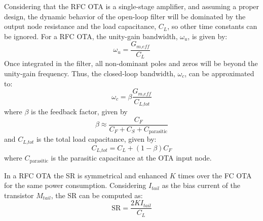 Considering that the RFC OTA is a single-stage amplifier, and assuming a proper design, the dynamic behavior of the open-loop filter will be dominated by the output node resistance and the load capacitance, $C_L$, so other time constants can be ignored. For a RFC OTA, the unity-gain bandwidth, $\omega_u$, is given by:
\begin{equation}
\omega_u = \frac{G_\textit{m,eff}}{C_L}
\end{equation}
Once integrated in the filter, all non-dominant poles and zeros will be beyond the unity-gain frequency. Thus, the closed-loop bandwidth, $\omega_c$, can be approximated to:
\begin{equation}
\omega_c = \beta \frac{G_\textit{m,eff}}{C_\textit{L,tot}}
\end{equation}
where $\beta$ is the feedback factor, given by
\begin{equation}
\beta \approx \frac{C_F}{C_F+C_S+C_\text{parasitic}}
\end{equation}
and $C_\textit{L,tot}$ is the total load capacitance, given by:
\begin{equation}
C_\textit{L,tot} = C_L + (1-\beta)C_F
\end{equation}
where $C_\text{parasitic}$ is the parasitic capacitance at the OTA input node.

In a RFC OTA the SR is symmetrical and enhanced $K$ times over the FC OTA for the same power consumption. Considering $I_\textit{tail}$ as the bias current of the transistor $M_\textit{tail}$, the SR can be computed as:
\begin{equation}
\text{SR} = \frac{2 K I_\textit{tail}}{C_L}
\end{equation}

